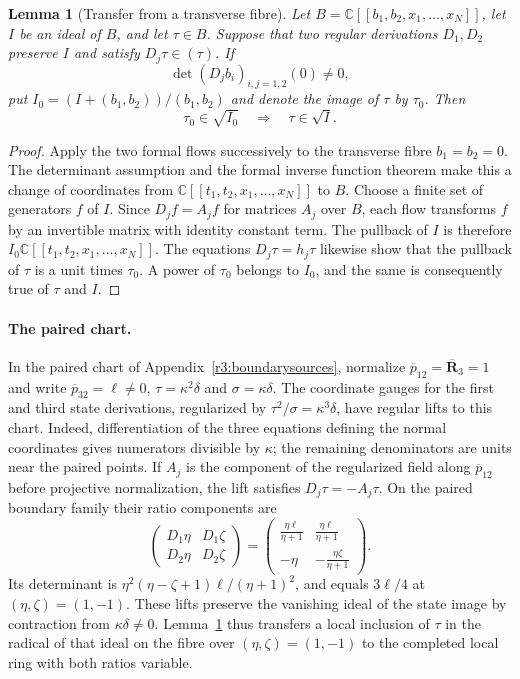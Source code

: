 \documentclass[11pt,a4paper]{article}
\numberwithin{equation}{section}
\theoremstyle{plain}
\newtheorem{lemma}[theorem]{Lemma}
\theoremstyle{definition}
\theoremstyle{remark}
\begin{document}
\begin{lemma}[Transfer from a transverse fibre]
\label{r3logic:formalbasetransfer}
Let $B=\mathbb C[[b_1,b_2,x_1,\ldots,x_N]]$, let $I$ be an ideal of $B$,
and let $\tau\in B$. Suppose that two regular derivations $D_1,D_2$
preserve $I$ and satisfy $D_j\tau\in(\tau)$. If
\[
 \det(D_jb_i)_{i,j=1,2}(0)\ne0,
\]
put $I_0=(I+(b_1,b_2))/(b_1,b_2)$ and denote the image of $\tau$
by $\tau_0$. Then
\[
              \tau_0\in\sqrt{I_0}\quad\Longrightarrow\quad
              \tau\in\sqrt I.
\]
\end{lemma}
\begin{proof}
Apply the two formal flows successively to the transverse fibre
$b_1=b_2=0$. The determinant assumption and the formal inverse
function theorem make this a change of coordinates from
$\mathbb C[[t_1,t_2,x_1,\ldots,x_N]]$ to $B$.
Choose a finite set of generators $f$ of $I$. Since $D_jf=A_jf$
for matrices $A_j$ over $B$, each flow transforms $f$ by an invertible
matrix with identity constant term. The pullback of $I$ is therefore
$I_0\mathbb C[[t_1,t_2,x_1,\ldots,x_N]]$.
The equations $D_j\tau=h_j\tau$ likewise show that the pullback of
$\tau$ is a unit times $\tau_0$. A power of $\tau_0$ belongs to
$I_0$, and the same is consequently true of $\tau$ and $I$.
\end{proof}

\paragraph{The paired chart.}
\label{r3logic:pairedtransfer}
In the paired chart of Appendix~\ref{r3:boundarysources}, normalize
$\overline p_{12}=\overline{\boldsymbol R}_3=1$ and write
$\overline p_{32}=\ell\ne0$, $\tau=\kappa^2\delta$ and
$\sigma=\kappa\delta$. The coordinate gauges for the first and third
state derivations, regularized by $\tau^2/\sigma=\kappa^3\delta$,
have regular lifts to this chart. Indeed, differentiation of the
three equations defining the normal coordinates gives numerators
divisible by $\kappa$; the remaining denominators are units near
the paired points. If $A_j$ is the component of the regularized
field along $\overline p_{12}$ before projective normalization,
the lift satisfies $D_j\tau=-A_j\tau$.
On the paired boundary family their ratio components are
\[
 \begin{pmatrix}
 D_1\eta&D_1\zeta\\
 D_2\eta&D_2\zeta
 \end{pmatrix}
 =
 \begin{pmatrix}
 \displaystyle\frac{\eta\ell}{\eta+1}&
 \displaystyle\frac{\eta\ell}{\eta+1}\\
 -\eta&\displaystyle-\frac{\eta\zeta}{\eta+1}
 \end{pmatrix}.
\]
Its determinant is $\eta^2(\eta-\zeta+1)\ell/(\eta+1)^2$,
and equals $3\ell/4$ at $(\eta,\zeta)=(1,-1)$.
These lifts preserve the vanishing ideal of the state image by contraction
from $\kappa\delta\ne0$.
Lemma~\ref{r3logic:formalbasetransfer} thus transfers a local
inclusion of $\tau$ in the radical of that ideal on the fibre over
$(\eta,\zeta)=(1,-1)$ to the completed local ring with both ratios variable.
\end{document}
